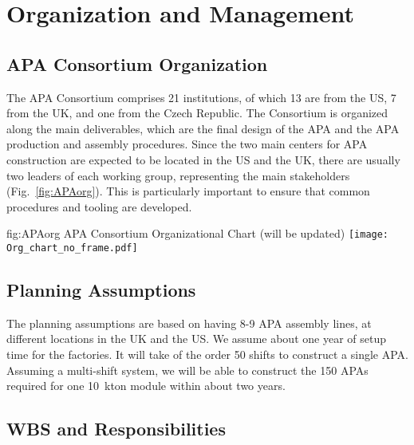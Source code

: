 \section{Organization and Management} %
\label{sec:fdsp-apa-org}

\subsection{APA Consortium Organization}
\label{sec:fdsp-apa-org-consortium}
The APA Consortium comprises 21 institutions, of which 13 are from the US, 7 from the UK, and one from the Czech Republic. The Consortium is organized along the main deliverables, which are the final design of the APA and the APA production and assembly procedures. Since the two main centers for APA construction are expected to be located in the US and the UK, there are usually two leaders of each working group, representing the main stakeholders (Fig.~\ref{fig:APAorg}). This is particularly important to ensure that common procedures and tooling are developed. 


\begin{dunefigure}{fig:APAorg}
{APA Consortium Organizational Chart (will be updated)}
\texttt{[image: Org\_chart\_no\_frame.pdf]}
\end{dunefigure}


\subsection{Planning Assumptions}
\label{sec:fdsp-apa-org-assmp}

The planning assumptions are based on having 8-9 APA assembly lines, at different locations in the UK and the US. 
We assume about one year of setup time for the factories.
It will take of the order 50 shifts to construct a single APA. Assuming a multi-shift system, we will be able to construct the 150 APAs required for one \SI{10}{kton} module within about two years.

\subsection{WBS and Responsibilities}
\label{sec:fdsp-apa-org-wbs}

